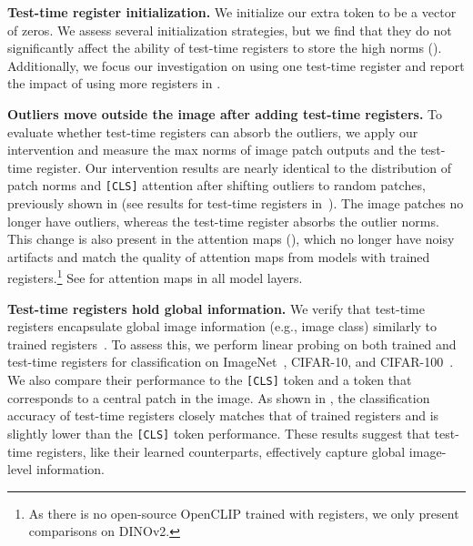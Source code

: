 \documentclass{article}
\begin{document}
\textbf{Test-time register initialization.} We initialize our extra token to be a vector of zeros. We assess several initialization strategies, but we find that they do not significantly affect the ability of test-time registers to store the high norms (). Additionally, we focus our investigation on using one test-time register and report the impact of using more registers in .

\textbf{Outliers move outside the image after adding test-time registers.} To evaluate whether test-time registers can absorb the outliers, we apply our intervention and measure the max norms of image patch outputs and the test-time register. Our intervention results are nearly identical to the distribution of patch norms and \texttt{[CLS]} attention after shifting outliers to random patches, previously shown in  (see results for test-time registers in~). The image patches no longer have outliers, whereas the test-time register absorbs the outlier norms. This change is also present in the attention maps (), which no longer have noisy artifacts and match the quality of attention maps from models with trained registers.\footnote{As there is no open-source OpenCLIP trained with registers, we only present comparisons on DINOv2.} See  for attention maps in all model layers.


\textbf{Test-time registers hold global information.} We verify that test-time registers encapsulate global image information (e.g., image class) similarly to trained registers~\citep{darcet2024vision}. To assess this, we perform linear probing on both trained and test-time registers for classification on ImageNet~\citep{imagenet}, CIFAR-10, and CIFAR-100~\citep{krizhevsky2009learning}. We also compare their performance to the \texttt{[CLS]} token and a token that corresponds to a central patch in the image. As shown in , the classification accuracy of test-time registers closely matches that of trained registers and is slightly lower than the \texttt{[CLS]} token performance. These results suggest that test-time registers, like their learned counterparts, effectively capture global image-level information. 
\end{document}

